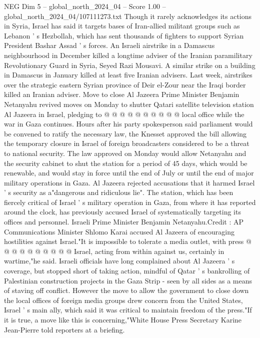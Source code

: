 \begin{textsample}{NEG Dim 5 – global\_north\_2024\_04 – Score 1.00 – global\_north\_2024\_04/107111273.txt}
Though it rarely acknowledges its actions in Syria, Israel has said it targets bases of Iran-allied militant groups such as Lebanon ' s Hezbollah, which has sent thousands of fighters to support Syrian President Bashar Assad ' s forces.
An Israeli airstrike in a Damascus neighbourhood in December killed a longtime adviser of the Iranian paramilitary Revolutionary Guard in Syria, Seyed Razi Mousavi.
A similar strike on a building in Damascus in January killed at least five Iranian advisers.
Last week, airstrikes over the strategic eastern Syrian province of Deir el-Zour near the Iraqi border killed an Iranian adviser.
Move to close Al Jazeera Prime Minister Benjamin Netanyahu revived moves on Monday to shutter Qatari satellite television station Al Jazeera in Israel, pledging to @ @ @ @ @ @ @ @ @ @ local office while the war in Gaza continues.
Hours after his party spokesperson said parliament would be convened to ratify the necessary law, the Knesset approved the bill allowing the temporary closure in Israel of foreign broadcasters considered to be a threat to national security.
The law approved on Monday would allow Netanyahu and the security cabinet to shut the station for a period of 45 days, which would be renewable, and would stay in force until the end of July or until the end of major military operations in Gaza.
Al Jazeera rejected accusations that it harmed Israel ' s security as a"dangerous and ridiculous lie".
The station, which has been fiercely critical of Israel ' s military operation in Gaza, from where it has reported around the clock, has previously accused Israel of systematically targeting its offices and personnel.
Israeli Prime Minister Benjamin Netanyahu.Credit : AP Communications Minister Shlomo Karai accused Al Jazeera of encouraging hostilities against Israel."It is impossible to tolerate a media outlet, with press @ @ @ @ @ @ @ @ @ @ Israel, acting from within against us, certainly in wartime,"he said.
Israeli officials have long complained about Al Jazeera ' s coverage, but stopped short of taking action, mindful of Qatar ' s bankrolling of Palestinian construction projects in the Gaza Strip - seen by all sides as a means of staving off conflict.
However the move to allow the government to close down the local offices of foreign media groups drew concern from the United States, Israel ' s main ally, which said it was critical to maintain freedom of the press."If it is true, a move like this is concerning,"White House Press Secretary Karine Jean-Pierre told reporters at a briefing.

\end{textsample}

